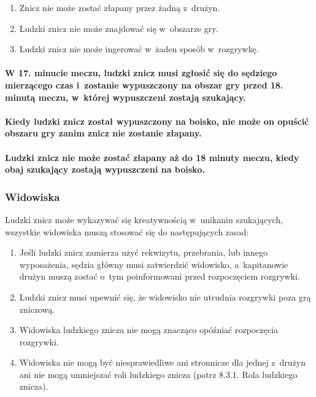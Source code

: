 \documentclass[12pt,a4paper]{article}
\begin{document}
\begin{enumerate}
	\item Znicz nie może zostać złapany przez żadną z~drużyn.

	\item Ludzki znicz nie może znajdować się w~obszarze gry.

	\item Ludzki znicz nie może ingerować w~żaden sposób w~rozgrywkę.
\end{enumerate}

\paragraph{W 17. minucie meczu, ludzki znicz musi zgłosić się do
	sędziego mierzącego czas i~zostanie wypuszczony na obszar gry przed 18.
	minutą meczu, w~której wypuszczeni zostają szukający.}

\paragraph{Kiedy ludzki znicz został wypuszczony na boisko, nie
	może on opuścić obszaru gry zanim znicz nie zostanie złapany.}

\paragraph{Ludzki znicz nie może zostać złapany aż do 18 minuty
	meczu, kiedy obaj szukający zostają wypuszczeni na
	boisko.}

\subsubsection{Widowiska}

Ludzki znicz może wykazywać się kreatywnością w~unikaniu szukających,
wszystkie widowiska muszą stosować się do następujących zasad:

\begin{enumerate}
	\item
	      Jeśli ludzki znicz zamierza użyć rekwizytu, przebrania, lub innego
	      wyposażenia, sędzia główny musi zatwierdzić widowisko, a~kapitanowie
	      drużyn muszą zostać o~tym poinformowani przed rozpoczęciem rozgrywki.
	\item
	      Ludzki znicz musi upewnić się, że widowisko nie utrudnia rozgrywki
	      poza grą zniczową.
	\item
	      Widowiska ludzkiego znicza nie mogą znacząco opóźniać rozpoczęcia
	      rozgrywki.
	\item
	      Widowiska nie mogą być niesprawiedliwe ani stronnicze dla jednej z~drużyn ani nie mogą umniejszać roli ludzkiego znicza (patrz 8.3.1.
	      Rola ludzkiego znicza).
\end{enumerate}
\end{document}
